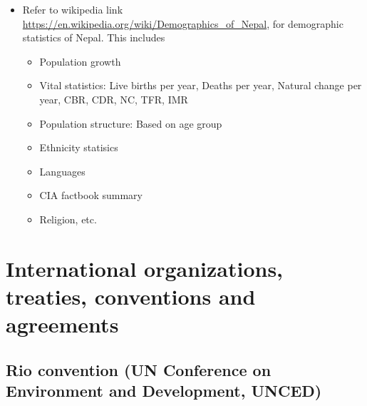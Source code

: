 \documentclass[
]{book}
\providecommand{\tightlist}{%
  \setlength{\itemsep}{0pt}\setlength{\parskip}{0pt}}
\begin{document}
\begin{itemize}
\tightlist
\item
  Refer to wikipedia link \url{https://en.wikipedia.org/wiki/Demographics_of_Nepal}, for demographic statistics of Nepal. This includes

  \begin{itemize}
  \tightlist
  \item
    Population growth
  \item
    Vital statistics: Live births per year, Deaths per year, Natural change per year, CBR, CDR, NC, TFR, IMR
  \item
    Population structure: Based on age group
  \item
    Ethnicity statisics
  \item
    Languages
  \item
    CIA factbook summary
  \item
    Religion, etc.
  \end{itemize}
\end{itemize}

\hypertarget{international-organizations-treaties-conventions-and-agreements}{%
\chapter{International organizations, treaties, conventions and agreements}\label{international-organizations-treaties-conventions-and-agreements}}

\hypertarget{rio-convention-un-conference-on-environment-and-development-unced}{%
\section{Rio convention (UN Conference on Environment and Development, UNCED)}\label{rio-convention-un-conference-on-environment-and-development-unced}}
\end{document}
